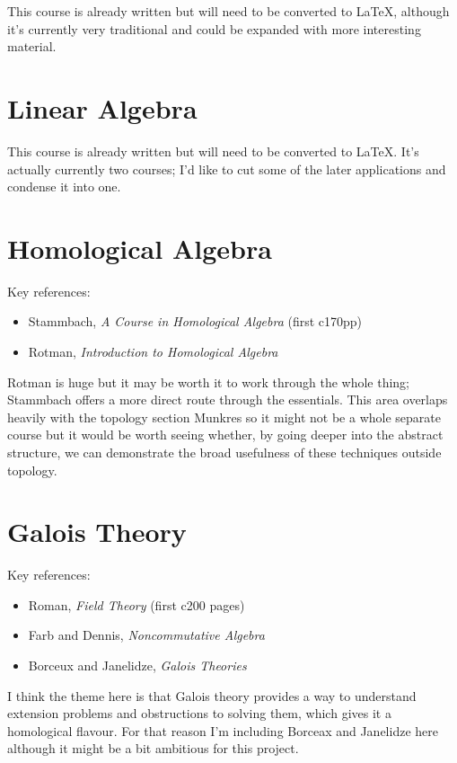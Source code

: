 \documentclass[article]{article}
\begin{document}
This course is already written but will need to be converted to \LaTeX, although it's currently very traditional and could be expanded with more interesting material.


\section{Linear Algebra}

This course is already written but will need to be converted to \LaTeX. It's actually currently two courses; I'd like to cut some of the later applications and condense it into one.

\section{Homological Algebra}

Key references:
\begin{itemize}
	\item{Stammbach, \textit{A Course in Homological Algebra} (first c170pp)}
	\item{Rotman, \textit{Introduction to Homological Algebra}}
\end{itemize}

Rotman is huge but it may be worth it to work through the whole thing; Stammbach offers a more direct route through the essentials. This area overlaps heavily with the topology section Munkres so it might not be a whole separate course but it would be worth seeing whether, by going deeper into the abstract structure, we can demonstrate the broad usefulness of these techniques outside topology.

\section{Galois Theory}

Key references:
\begin{itemize}
	\item{Roman, \textit{Field Theory} (first c200 pages)}
	\item{Farb and Dennis, \textit{Noncommutative Algebra}}
	\item{Borceux and Janelidze, \textit{Galois Theories}}
\end{itemize}

I think the theme here is that Galois theory provides a way to understand extension problems and obstructions to solving them, which gives it a homological flavour. For that reason I'm including Borceax and Janelidze here although it might be a bit ambitious for this project.
\end{document}
